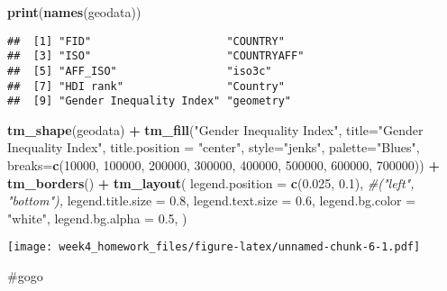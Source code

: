 \documentclass[
]{article}
\newenvironment{Shaded}{\begin{snugshade}}{\end{snugshade}}
\newcommand{\AttributeTok}[1]{\textcolor[rgb]{0.13,0.29,0.53}{#1}}
\newcommand{\CommentTok}[1]{\textcolor[rgb]{0.56,0.35,0.01}{\textit{#1}}}
\newcommand{\DecValTok}[1]{\textcolor[rgb]{0.00,0.00,0.81}{#1}}
\newcommand{\FloatTok}[1]{\textcolor[rgb]{0.00,0.00,0.81}{#1}}
\newcommand{\FunctionTok}[1]{\textcolor[rgb]{0.13,0.29,0.53}{\textbf{#1}}}
\newcommand{\NormalTok}[1]{#1}
\newcommand{\SpecialCharTok}[1]{\textcolor[rgb]{0.81,0.36,0.00}{\textbf{#1}}}
\newcommand{\StringTok}[1]{\textcolor[rgb]{0.31,0.60,0.02}{#1}}
\begin{document}
\begin{Shaded}
\begin{Highlighting}[]
\FunctionTok{print}\NormalTok{(}\FunctionTok{names}\NormalTok{(geodata))}
\end{Highlighting}
\end{Shaded}

\begin{verbatim}
##  [1] "FID"                     "COUNTRY"                
##  [3] "ISO"                     "COUNTRYAFF"             
##  [5] "AFF_ISO"                 "iso3c"                  
##  [7] "HDI rank"                "Country"                
##  [9] "Gender Inequality Index" "geometry"
\end{verbatim}

\begin{Shaded}
\begin{Highlighting}[]
\FunctionTok{tm\_shape}\NormalTok{(geodata) }\SpecialCharTok{+}
  \FunctionTok{tm\_fill}\NormalTok{(}\StringTok{"Gender Inequality Index"}\NormalTok{,}
          \AttributeTok{title=}\StringTok{"Gender Inequality Index"}\NormalTok{,}
          \AttributeTok{title.position =} \StringTok{"center"}\NormalTok{,}
          \AttributeTok{style=}\StringTok{"jenks"}\NormalTok{,}
          \AttributeTok{palette=}\StringTok{"Blues"}\NormalTok{,}
          \AttributeTok{breaks=}\FunctionTok{c}\NormalTok{(}\DecValTok{10000}\NormalTok{, }\DecValTok{100000}\NormalTok{, }\DecValTok{200000}\NormalTok{, }\DecValTok{300000}\NormalTok{, }\DecValTok{400000}\NormalTok{, }\DecValTok{500000}\NormalTok{, }\DecValTok{600000}\NormalTok{, }\DecValTok{700000}\NormalTok{)) }\SpecialCharTok{+}
  \FunctionTok{tm\_borders}\NormalTok{() }\SpecialCharTok{+}
  \FunctionTok{tm\_layout}\NormalTok{(}
    \AttributeTok{legend.position =} \FunctionTok{c}\NormalTok{(}\FloatTok{0.025}\NormalTok{, }\FloatTok{0.1}\NormalTok{), }\CommentTok{\#("left", "bottom"),}
    \AttributeTok{legend.title.size =} \FloatTok{0.8}\NormalTok{,}
    \AttributeTok{legend.text.size =} \FloatTok{0.6}\NormalTok{,}
    \AttributeTok{legend.bg.color =} \StringTok{"white"}\NormalTok{,}
    \AttributeTok{legend.bg.alpha =} \FloatTok{0.5}\NormalTok{,}
\NormalTok{  )}
\end{Highlighting}
\end{Shaded}

\texttt{[image: week4\_homework\_files/figure-latex/unnamed-chunk-6-1.pdf]}

\#gogo
\end{document}
